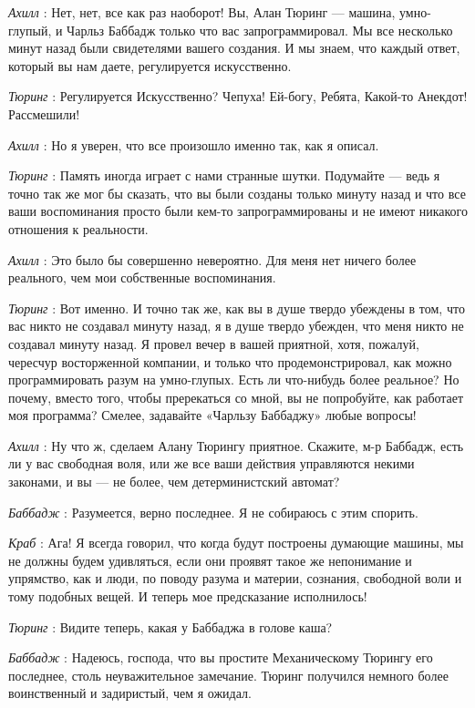 \emph{Ахилл} : Нет, нет, все как раз наоборот! Вы, Алан Тюринг --- машина, умно-глупый, и Чарльз Баббадж только что вас запрограммировал. Мы все несколько минут назад были свидетелями вашего создания. И мы знаем, что каждый ответ, который вы нам даете, регулируется искусственно.

\emph{Тюринг} : Регулируется Искусственно? Чепуха! Ей-богу, Ребята, Какой-то Анекдот! Рассмешили!

\emph{Ахилл} : Но я уверен, что все произошло именно так, как я описал.

\emph{Тюринг} : Память иногда играет с нами странные шутки. Подумайте --- ведь я точно так же мог бы сказать, что вы были созданы только минуту назад и что все ваши воспоминания просто были кем-то запрограммированы и не имеют никакого отношения к реальности.

\emph{Ахилл} : Это было бы совершенно невероятно. Для меня нет ничего более реального, чем мои собственные воспоминания.

\emph{Тюринг} : Вот именно. И точно так же, как вы в душе твердо убеждены в том, что вас никто не создавал минуту назад, я в душе твердо убежден, что меня никто не создавал минуту назад. Я провел вечер в вашей приятной, хотя, пожалуй, чересчур восторженной компании, и только что продемонстрировал, как можно программировать разум на умно-глупых. Есть ли что-нибудь более реальное? Но почему, вместо того, чтобы пререкаться со мной, вы не попробуйте, как работает моя программа? Смелее, задавайте «Чарльзу Баббаджу» любые вопросы!

\emph{Ахилл} : Ну что ж, сделаем Алану Тюрингу приятное. Скажите, м-р Баббадж, есть ли у вас свободная воля, или же все ваши действия управляются некими законами, и вы --- не более, чем детерминистский автомат?

\emph{Баббадж} : Разумеется, верно последнее. Я не собираюсь с этим спорить.

\emph{Краб} : Ага! Я всегда говорил, что когда будут построены думающие машины, мы не должны будем удивляться, если они проявят такое же непонимание и упрямство, как и люди, по поводу разума и материи, сознания, свободной воли и тому подобных вещей. И теперь мое предсказание исполнилось!

\emph{Тюринг} : Видите теперь, какая у Баббаджа в голове каша?

\emph{Баббадж} : Надеюсь, господа, что вы простите Механическому Тюрингу его последнее, столь неуважительное замечание. Тюринг получился немного более воинственный и задиристый, чем я ожидал.

